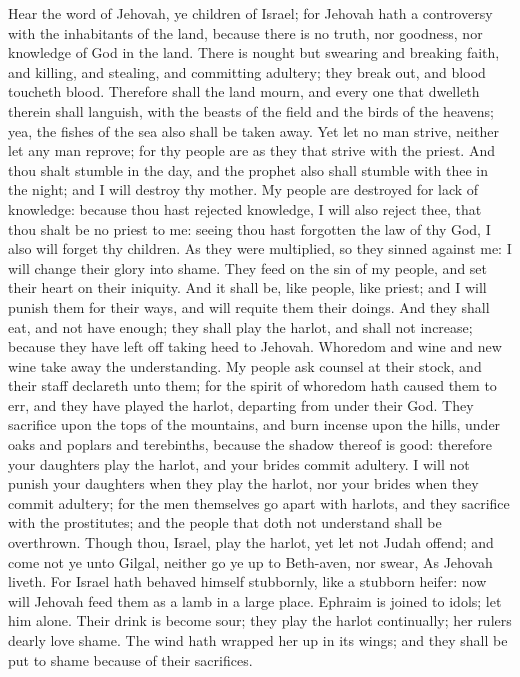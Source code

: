 Hear the word of Jehovah, ye children of Israel; for Jehovah hath a controversy with the inhabitants of the land, because there is no truth, nor goodness, nor knowledge of God in the land. There is nought but swearing and breaking faith, and killing, and stealing, and committing adultery; they break out, and blood toucheth blood. Therefore shall the land mourn, and every one that dwelleth therein shall languish, with the beasts of the field and the birds of the heavens; yea, the fishes of the sea also shall be taken away. Yet let no man strive, neither let any man reprove; for thy people are as they that strive with the priest. And thou shalt stumble in the day, and the prophet also shall stumble with thee in the night; and I will destroy thy mother.  My people are destroyed for lack of knowledge: because thou hast rejected knowledge, I will also reject thee, that thou shalt be no priest to me: seeing thou hast forgotten the law of thy God, I also will forget thy children. As they were multiplied, so they sinned against me: I will change their glory into shame. They feed on the sin of my people, and set their heart on their iniquity. And it shall be, like people, like priest; and I will punish them for their ways, and will requite them their doings. And they shall eat, and not have enough; they shall play the harlot, and shall not increase; because they have left off taking heed to Jehovah.  Whoredom and wine and new wine take away the understanding. My people ask counsel at their stock, and their staff declareth unto them; for the spirit of whoredom hath caused them to err, and they have played the harlot, departing from under their God. They sacrifice upon the tops of the mountains, and burn incense upon the hills, under oaks and poplars and terebinths, because the shadow thereof is good: therefore your daughters play the harlot, and your brides commit adultery. I will not punish your daughters when they play the harlot, nor your brides when they commit adultery; for the men themselves go apart with harlots, and they sacrifice with the prostitutes; and the people that doth not understand shall be overthrown.  Though thou, Israel, play the harlot, yet let not Judah offend; and come not ye unto Gilgal, neither go ye up to Beth-aven, nor swear, As Jehovah liveth. For Israel hath behaved himself stubbornly, like a stubborn heifer: now will Jehovah feed them as a lamb in a large place. Ephraim is joined to idols; let him alone. Their drink is become sour; they play the harlot continually; her rulers dearly love shame. The wind hath wrapped her up in its wings; and they shall be put to shame because of their sacrifices. 

